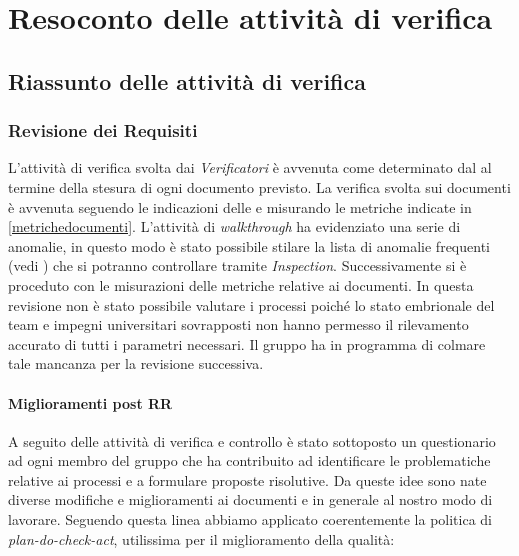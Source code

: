 \section{Resoconto delle attività di verifica}

	\subsection{Riassunto delle attività di verifica}
	\label{RiassuntoAttivitaVerifica}
	
	 	\subsubsection{Revisione dei Requisiti}
	 	L'attività di verifica svolta dai \emph{Verificatori} è avvenuta come determinato dal \PianoDiProgetto{} al termine della stesura di ogni documento previsto. La verifica svolta sui documenti è avvenuta seguendo le indicazioni delle \NormeDiProgetto{} e misurando le metriche indicate in \ref{metrichedocumenti}. L'attività di \emph{walkthrough} ha evidenziato una serie di anomalie, in questo modo è stato possibile stilare la lista di anomalie frequenti (vedi \NormeDiProgetto{}) che si potranno controllare tramite \emph{Inspection}. Successivamente si è proceduto con le misurazioni delle metriche relative ai documenti.
In questa revisione non è stato possibile valutare i processi poiché lo stato embrionale del team e   impegni universitari sovrapposti non hanno permesso il rilevamento accurato di tutti i parametri necessari. Il gruppo ha in programma di colmare tale mancanza per la revisione successiva.

		\paragraph{Miglioramenti post RR}
		A seguito delle attività di verifica e controllo è stato sottoposto un questionario ad ogni membro del gruppo che ha contribuito ad identificare le problematiche relative ai processi e a formulare proposte risolutive. Da queste idee sono nate diverse modifiche e miglioramenti ai documenti e in generale al nostro modo di lavorare. Seguendo questa linea abbiamo applicato coerentemente la politica di \textit{plan-do-check-act}, utilissima per il miglioramento della qualità: \\
			

